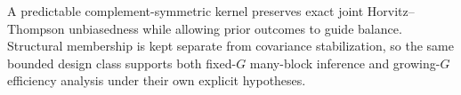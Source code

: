 A predictable complement-symmetric kernel preserves exact joint Horvitz--Thompson unbiasedness while allowing prior outcomes to guide balance.  Structural membership is kept separate from covariance stabilization, so the same bounded design class supports both fixed-\(G\) many-block inference and growing-\(G\) efficiency analysis under their own explicit hypotheses.